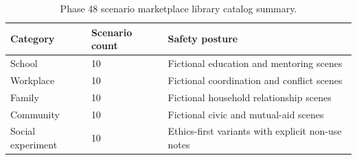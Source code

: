 \begin{table}[h]
\centering
\begin{tabular}{lll}
\toprule
Category & Scenario count & Safety posture \\
\midrule
School & 10 & Fictional education and mentoring scenes \\
Workplace & 10 & Fictional coordination and conflict scenes \\
Family & 10 & Fictional household relationship scenes \\
Community & 10 & Fictional civic and mutual-aid scenes \\
Social experiment & 10 & Ethics-first variants with explicit non-use notes \\
\bottomrule
\end{tabular}
\caption{Phase 48 scenario marketplace library catalog summary.}
\label{tab:scenario-library-summary}
\end{table}
